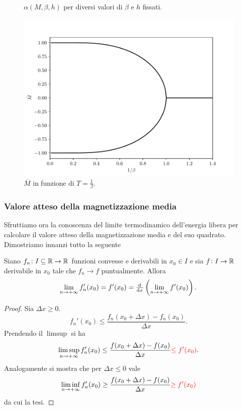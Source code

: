 \iffigureon
\begin{figure}[p]
    \centering
    \subfloat{}
    \subfloat{} \\
    \subfloat{}
    \subfloat{}
    \caption{$ \alpha(M,\beta,h) $ per diversi valori di $ \beta $ e $ h $ fissati.}
    \label{fig:alpha}
\end{figure}
\begin{figure}[p]
    \centering
    \includegraphics[scale=0.8]{img/cw/transizione.pdf}
    \caption{$ \overline{M} $ in funzione di $ T = \frac{1}{\beta}$.}
    \label{fig:transizione}
\end{figure}
\fi

\subsubsection{Valore atteso della magnetizzazione media}
Sfruttiamo ora la conoscenza del limite termodinamico dell'energia libera per calcolare il valore atteso della magnetizzazione media e del suo quadrato. Dimostriamo innanzi tutto la seguente
\begin{proposition}
    Siano $ f_n\colon I\subseteq\mathbb{R} \to \mathbb{R} $ funzioni convesse e derivabili in $ x_0 \in I $ e sia $ f\colon I\to\mathbb{R} $ derivabile in $ x_0 $ tale che $ f_n \to f $ puntualmente. Allora
    \[ \lim_{n \to +\infty} f_n'(x_0) = f'(x_0) = \od{}{x} \left( \lim_{n \to +\infty} f'(x_0) \right). \]
\end{proposition}
\begin{proof}\label{prop:convessascambio}
    Sia $ \Delta x \geq 0 $.
    \[ f_n'(x_0) \leq \frac{f_n(x_0+\Delta x)-f_n(x_0)}{\Delta x}. \]
    Prendendo il $ \limsup $ si ha
    \[ \limsup_{n\to +\infty} f'_n(x_0) \leq \frac{f(x_0+\Delta x)-f(x_0)}{\Delta x} \textcolor{red}{\leq f'(x_0)}. \]
    Analogamente si mostra che per $ \Delta x \leq 0 $ vale
    \[ \liminf_{n\to +\infty} f_n'(x_0) \geq \frac{f(x_0+\Delta x)-f(x_0)}{\Delta x} \textcolor{red}{\geq f'(x_0)} \]
    da cui la tesi.
\end{proof}

